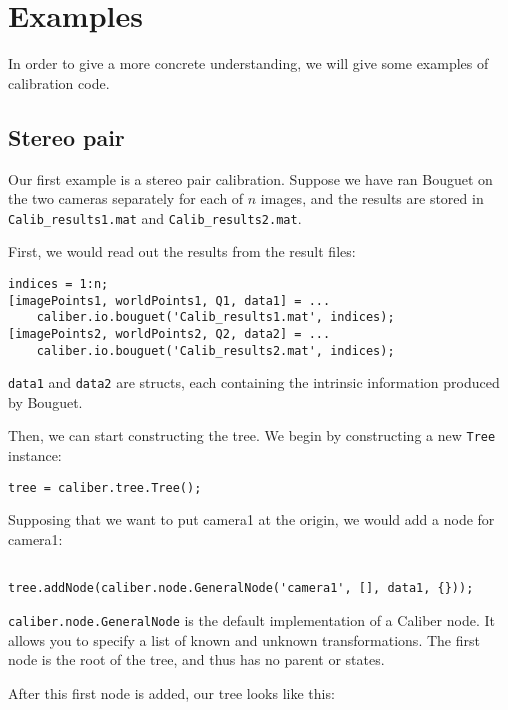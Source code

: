 \section{Examples}

In order to give a more concrete understanding, we will give some examples of calibration code.

\subsection{Stereo pair}

Our first example is a stereo pair calibration. Suppose we have ran Bouguet on the two cameras separately for each of 
$n$ images, and the results are stored in \texttt{Calib\_results1.mat} and \texttt{Calib\_results2.mat}.

First, we would read out the results from the result files:

\begin{verbatim}
indices = 1:n;
[imagePoints1, worldPoints1, Q1, data1] = ...
    caliber.io.bouguet('Calib_results1.mat', indices);
[imagePoints2, worldPoints2, Q2, data2] = ...
    caliber.io.bouguet('Calib_results2.mat', indices);
\end{verbatim}

\texttt{data1} and \texttt{data2} are structs, each containing the intrinsic information produced
by Bouguet.

Then, we can start constructing the tree. We begin by constructing a new \texttt{Tree} instance:

\begin{verbatim}
tree = caliber.tree.Tree();
\end{verbatim}

Supposing that we want to put camera1
at the origin, we would add a node for camera1:

\begin{verbatim}

tree.addNode(caliber.node.GeneralNode('camera1', [], data1, {}));
\end{verbatim}

\texttt{caliber.node.GeneralNode} is the default implementation of a Caliber node.
It allows you to specify a list of known and unknown transformations.
The first node is the root of the tree, and thus has no parent or states.

After this first node is added, our tree looks like this:

\centerline{}

